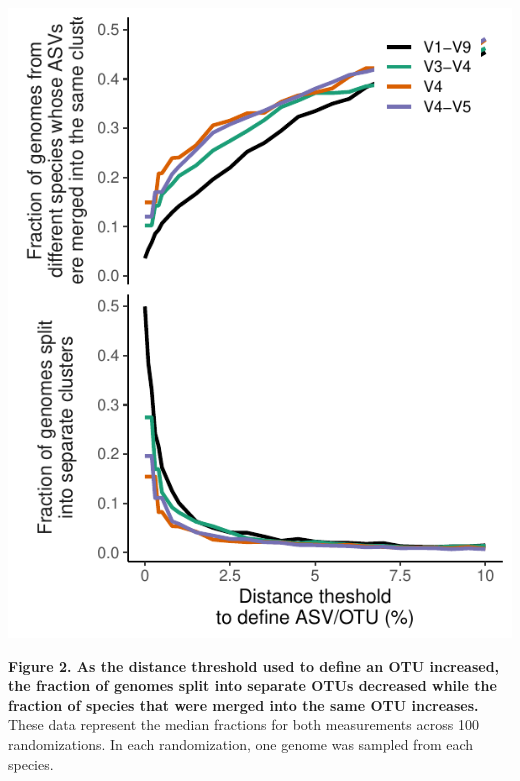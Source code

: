 \documentclass[
]{article}
\begin{document}
\includegraphics{../figures/lump_split.pdf}

\textbf{Figure 2. As the distance threshold used to define an OTU
increased, the fraction of genomes split into separate OTUs decreased
while the fraction of species that were merged into the same OTU
increases.} These data represent the median fractions for both
measurements across 100 randomizations. In each randomization, one
genome was sampled from each species.

\newpage
\end{document}
